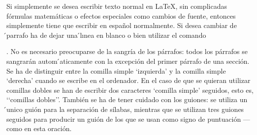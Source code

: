\documentclass[a4paper,10pt]{letter}
\begin{document}
Si simplemente se desea escribir texto normal en LaTeX,
sin complicadas fórmulas matemáticas o efectos especiales
como cambios de fuente, entonces simplemente tiene que escribir
en español normalmente.
Si desea cambiar de  ́parrafo ha de dejar una  ́lınea en blanco o bien
utilizar el comando \par.
No es necesario preocuparse de la sangría de los párrafos:
todos los párrafos se sangrarán autom ́aticamente con la excepción
del primer párrafo de una sección.
Se ha de distinguir entre la comilla simple ‘izquierda’
y la comilla simple ‘derecha’ cuando se escribe en el ordenador.
En el caso de que se quieran utilizar comillas dobles se han de
escribir dos caracteres ‘comilla simple’ seguidos, esto es,
‘‘comillas dobles’’.
También se ha de tener cuidado con los guiones: se utiliza un ́unico
guión para la separación de sílabas, mientras que se utilizan
tres guiones seguidos para producir un guión de los que se usan
como signo de puntuación --- como en esta oración.
\end{document}
